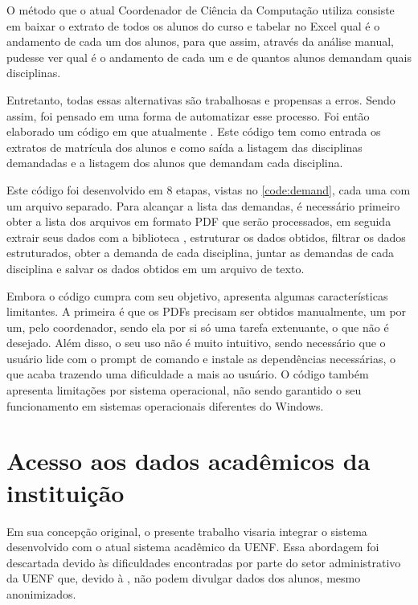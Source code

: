 O método que o atual Coordenador de Ciência da Computação utiliza consiste em baixar o extrato de todos os alunos do curso e tabelar no Excel qual é o andamento de cada um dos alunos, para que assim, através da análise manual, pudesse ver qual é o andamento de cada um e de quantos alunos demandam quais disciplinas.

Entretanto, todas essas alternativas são trabalhosas e propensas a erros. Sendo assim, foi pensado em uma forma de automatizar esse processo. Foi então elaborado um código em  que atualmente . Este código tem como entrada os extratos de matrícula dos alunos e como saída a listagem das disciplinas demandadas e a listagem dos alunos que demandam cada disciplina.



Este código foi desenvolvido em 8 etapas, vistas no \autoref{code:demand}, cada uma com um arquivo separado. Para alcançar a lista das demandas, é necessário primeiro obter a lista dos arquivos em formato PDF que serão processados, em seguida extrair seus dados com a biblioteca , estruturar os dados obtidos, filtrar os dados estruturados, obter a demanda de cada disciplina, juntar as demandas de cada disciplina e salvar os dados obtidos em um arquivo de texto.

Embora o código cumpra com seu objetivo, apresenta algumas características limitantes. A primeira é que os PDFs precisam ser obtidos manualmente, um por um, pelo coordenador, sendo ela por si só uma tarefa extenuante, o que não é desejado. Além disso, o seu uso não é muito intuitivo, sendo necessário que o usuário lide com o prompt de comando e instale as dependências necessárias, o que acaba trazendo uma dificuldade a mais ao usuário. O código também apresenta limitações por sistema operacional, não sendo garantido o seu funcionamento em sistemas operacionais diferentes do Windows.

\section{Acesso aos dados acadêmicos da instituição} \label{sec:LGPD} %

Em sua concepção original, o presente trabalho visaria integrar o sistema desenvolvido com o atual sistema acadêmico da UENF. Essa abordagem foi descartada devido às dificuldades encontradas por parte do setor administrativo da UENF que, devido à , não podem divulgar dados dos alunos, mesmo anonimizados.

